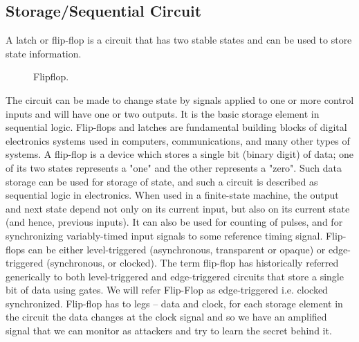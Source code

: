 \subsection{ Storage/Sequential Circuit }
A latch or flip-flop is a circuit that has two stable states and can be used to store state information. 
\begin{figure}[h]
    \centering
    
    \caption{Flipflop.} \label{fig:flipflop}
\end{figure}
\newline
The circuit can be made to change state by signals applied to one or more control inputs and will have one or two outputs. It is the basic storage element in sequential logic. Flip-flops and latches are fundamental building blocks of digital electronics systems used in computers, communications, and many other types of systems.
A flip-flop is a device which stores a single bit (binary digit) of data; one of its two states represents a "one" and the other represents a "zero". Such data storage can be used for storage of state, and such a circuit is described as sequential logic in electronics. When used in a finite-state machine, the output and next state depend not only on its current input, but also on its current state (and hence, previous inputs). It can also be used for counting of pulses, and for synchronizing variably-timed input signals to some reference timing signal.
Flip-flops can be either level-triggered (asynchronous, transparent or opaque) or edge-triggered (synchronous, or clocked). The term flip-flop has historically referred generically to both level-triggered and edge-triggered circuits that store a single bit of data using gates. We will refer Flip-Flop as edge-triggered i.e. clocked synchronized.
Flip-flop has to legs – data and clock, for each storage element in the circuit the data changes at the clock signal and so we have an amplified signal that we can monitor as attackers and try to learn the secret behind it.
\pagebreak
